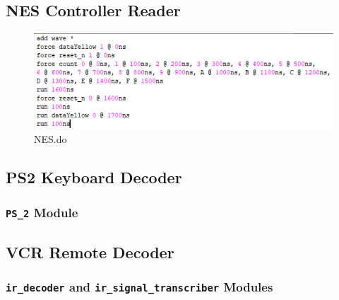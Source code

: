 \documentclass[a4paper]{article}
\makeatletter
\newcommand{\filecaption}[1]{\filename@parse{#1}\filename@base.\filename@ext}
\newcommand{\filelisting}[2][]{%
}
\makeatother
\begin{document}
\subsection{NES Controller Reader}

\begin{figure}[H]
  \centering
    \includegraphics[width=.85\textwidth]{images/ModelSim/nesdo.JPG}
	\caption{NES.do}
    \label{fig:top_level_do}
\end{figure}

\subsection{PS2 Keyboard Decoder}

\subsubsection{\texttt{PS\_2} Module}
\filelisting[label=lst:sim_ps2_ps_2]{../do_files/ps2/PS2.do}

\subsection{VCR Remote Decoder}

\subsubsection{\texttt{ir\_decoder} and \texttt{ir\_signal\_transcriber} Modules}
\filelisting{../do_files/vcr_remote/setup.do}
\filelisting{../do_files/vcr_remote/reset.do}
\filelisting[label=lst:sim_vcr_ir_decoder_0]{../do_files/vcr_remote/0.do}
\filelisting[label=lst:sim_vcr_ir_decoder_1]{../do_files/vcr_remote/1.do}
\filelisting[label=lst:sim_vcr_ir_decoder_2]{../do_files/vcr_remote/2.do}
\filelisting[label=lst:sim_vcr_ir_decoder_3]{../do_files/vcr_remote/3.do}
\filelisting[label=lst:sim_vcr_ir_decoder_4]{../do_files/vcr_remote/4.do}
\filelisting[label=lst:sim_vcr_ir_decoder_5]{../do_files/vcr_remote/5.do}
\filelisting[label=lst:sim_vcr_ir_decoder_6]{../do_files/vcr_remote/6.do}
\filelisting[label=lst:sim_vcr_ir_decoder_7]{../do_files/vcr_remote/7.do}
\filelisting[label=lst:sim_vcr_ir_decoder_8]{../do_files/vcr_remote/8.do}
\filelisting[label=lst:sim_vcr_ir_decoder_9]{../do_files/vcr_remote/9.do}
\filelisting[label=lst:sim_vcr_ir_decoder_sequence]{../do_files/vcr_remote/sequence.do}
\filelisting[label=lst:sim_vcr_ir_decoder_bad_checksum]{../do_files/vcr_remote/bad_checksum.do}
\end{document}
